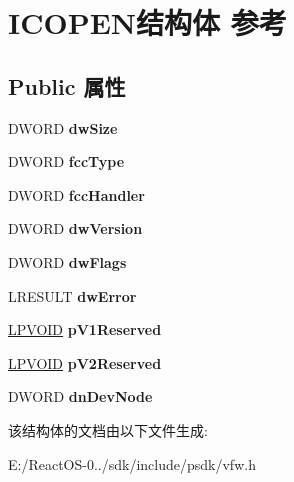 \hypertarget{struct_i_c_o_p_e_n}{}\section{I\+C\+O\+P\+E\+N结构体 参考}
\label{struct_i_c_o_p_e_n}
\subsection*{Public 属性}
\begin{DoxyCompactItemize}
\item 
\mbox{\label{struct_i_c_o_p_e_n_aa083c499063e43d183651099663aaa6b}} 
D\+W\+O\+RD {\bfseries dw\+Size}
\item 
\mbox{\label{struct_i_c_o_p_e_n_aff90c3fd54d80686ed04015fa62feca6}} 
D\+W\+O\+RD {\bfseries fcc\+Type}
\item 
\mbox{\label{struct_i_c_o_p_e_n_ad07d0b48ad8a3181a3173e54aaa27ccd}} 
D\+W\+O\+RD {\bfseries fcc\+Handler}
\item 
\mbox{\label{struct_i_c_o_p_e_n_aac0779e21b4622c120cc9ade9eff66db}} 
D\+W\+O\+RD {\bfseries dw\+Version}
\item 
\mbox{\label{struct_i_c_o_p_e_n_afc7f06d01d45b82e8a8ac87c61685030}} 
D\+W\+O\+RD {\bfseries dw\+Flags}
\item 
\mbox{\label{struct_i_c_o_p_e_n_a3341111aa278c6f97d1b718073b31ea7}} 
L\+R\+E\+S\+U\+LT {\bfseries dw\+Error}
\item 
\mbox{\label{struct_i_c_o_p_e_n_a4f2c3b2d51a86b0ecd057f3a62453c86}} 
\hyperlink{interfacevoid}{L\+P\+V\+O\+ID} {\bfseries p\+V1\+Reserved}
\item 
\mbox{\label{struct_i_c_o_p_e_n_a949d1fb443ecba1dfc4945684f8c1a6d}} 
\hyperlink{interfacevoid}{L\+P\+V\+O\+ID} {\bfseries p\+V2\+Reserved}
\item 
\mbox{\label{struct_i_c_o_p_e_n_a949a607ccd60e01466caffe39b7ff8a8}} 
D\+W\+O\+RD {\bfseries dn\+Dev\+Node}
\end{DoxyCompactItemize}


该结构体的文档由以下文件生成\+:\begin{DoxyCompactItemize}
\item 
E\+:/\+React\+O\+S-\/0../sdk/include/psdk/vfw.\+h\end{DoxyCompactItemize}
